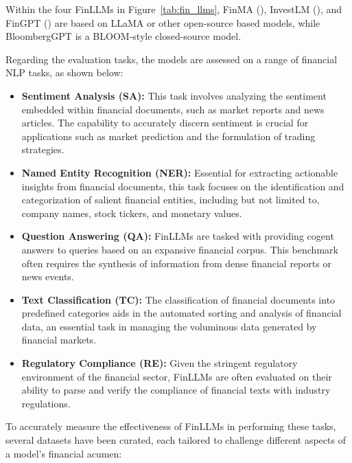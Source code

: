 Within the four FinLLMs in Figure~\ref{tab:fin_llms}, FinMA (\textcite{xie2023pixiu}), InvestLM (\textcite{yang2023investlm}), and FinGPT (\textcite{wang2023fingpt}) are based on LLaMA or other open-source based models, while BloombergGPT \textcite{wu2023bloomberggpt} is a BLOOM-style closed-source model.

Regarding the evaluation tasks, the models are assessed on a range of financial NLP tasks, as shown below:

\begin{itemize}
	\item \textbf{Sentiment Analysis (SA):} {This task involves analyzing the sentiment embedded within financial documents, such as market reports and news articles. The capability to accurately discern sentiment is crucial for applications such as market prediction and the formulation of trading strategies.}

	\item \textbf{Named Entity Recognition (NER):} {Essential for extracting actionable insights from financial documents, this task focuses on the identification and categorization of salient financial entities, including but not limited to, company names, stock tickers, and monetary values.}

	\item \textbf{Question Answering (QA):} {FinLLMs are tasked with providing cogent answers to queries based on an expansive financial corpus. This benchmark often requires the synthesis of information from dense financial reports or news events.}

	\item \textbf{Text Classification (TC):} {The classification of financial documents into predefined categories aids in the automated sorting and analysis of financial data, an essential task in managing the voluminous data generated by financial markets.}

	\item \textbf{Regulatory Compliance (RE):} {Given the stringent regulatory environment of the financial sector, FinLLMs are often evaluated on their ability to parse and verify the compliance of financial texts with industry regulations.}
\end{itemize}

To accurately measure the effectiveness of FinLLMs in performing these tasks, several datasets have been curated, each tailored to challenge different aspects of a model's financial acumen:


